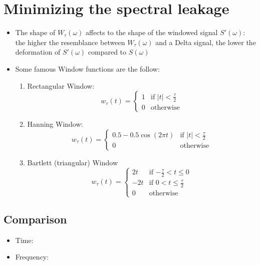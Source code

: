 \section{Minimizing the spectral leakage}

\begin{itemize}
\item The shape of $W_\tau(\omega)$ affects to the shape of the
  windowed signal $S'(\omega)$: the higher the resemblance between
  $W_\tau(\omega)$ and a Delta signal, the lower the deformation of
  $S'(\omega)$ compared to $S(\omega)$%

\item Some famous Window functions are the follow:
  \begin{enumerate}
  \item Rectangular Window:
    \begin{equation}
      w_\tau(t) =
      \left\{
      \begin{array}{ll}
        1 & \text{if $|t|<\frac{\tau}{2}$}\\
        0 & \text{otherwise}
      \end{array}
      \right.
    \end{equation}

  \item Hanning Window:
    \begin{equation}
      w_\tau(t) =
      \left\{
      \begin{array}{ll}
        0.5-0.5\cos(2\pi t) & \text{if $|t|<\frac{\tau}{2}$}\\
        0 & \text{otherwise}
      \end{array}
      \right.
    \end{equation}

  \item Bartlett (triangular) Window
    \begin{equation}
      w_\tau(t) =
      \left\{
      \begin{array}{ll}
        2t & \text{if $-\frac{\tau}{2}<t\le 0$}\\
        -2t & \text{if $0<t\le \frac{\tau}{2}$}\\
        0 & \text{otherwise}
      \end{array}
      \right.
    \end{equation}
    
  \end{enumerate}
  
\end{itemize}

\subsection*{Comparison}
\begin{itemize}
\item Time:
\item Frequency:
\end{itemize}


